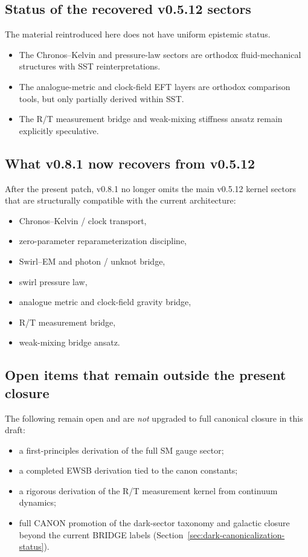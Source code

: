 \documentclass[11pt]{article}
\theoremstyle{definition}
\theoremstyle{plain}
\theoremstyle{remark}
\begin{document}
    \subsection{Status of the recovered v0.5.12 sectors}

        The material reintroduced here does not have uniform epistemic status.

        \begin{itemize}
            \item The Chronos--Kelvin and pressure-law sectors are orthodox fluid-mechanical structures with SST reinterpretations.
            \item The analogue-metric and clock-field EFT layers are orthodox comparison tools, but only partially derived within SST.
            \item The R/T measurement bridge and weak-mixing stiffness ansatz remain explicitly speculative.
        \end{itemize}

    \subsection{What v0.8.1 now recovers from v0.5.12}

        After the present patch, v0.8.1 no longer omits the main v0.5.12 kernel sectors that are structurally compatible with the current architecture:
        \begin{itemize}
            \item Chronos--Kelvin / clock transport,
            \item zero-parameter reparameterization discipline,
            \item Swirl--EM and photon / unknot bridge,
            \item swirl pressure law,
            \item analogue metric and clock-field gravity bridge,
            \item R/T measurement bridge,
            \item weak-mixing bridge ansatz.
        \end{itemize}

    \subsection{Open items that remain outside the present closure}

        The following remain open and are \emph{not} upgraded to full canonical closure in this draft:
        \begin{itemize}
            \item a first-principles derivation of the full SM gauge sector;
            \item a completed EWSB derivation tied to the canon constants;
            \item a rigorous derivation of the R/T measurement kernel from continuum dynamics;
            \item full CANON promotion of the dark-sector taxonomy and galactic closure beyond the current BRIDGE labels (Section~\ref{sec:dark-canonicalization-status}).
        \end{itemize}
\end{document}
